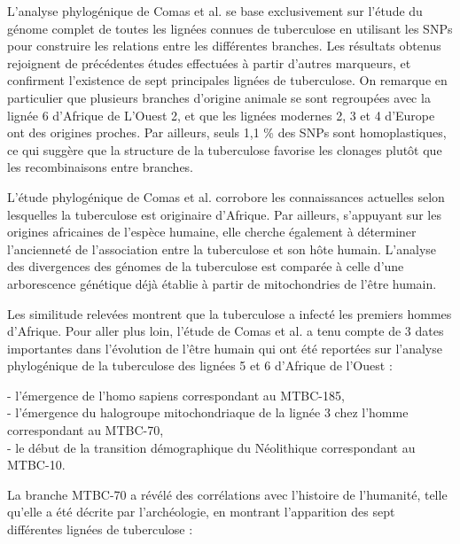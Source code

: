 \documentclass[twoside,a4paper,11pt,frenchb,openany]{report}
\begin{document}

L'analyse phylogénique de Comas et al.\cite{comas} se base exclusivement sur l'étude du génome complet de toutes les lignées connues de tuberculose en utilisant les SNPs pour construire les relations entre les différentes branches. Les résultats obtenus rejoignent de précédentes études effectuées à partir d'autres marqueurs, et confirment l'existence de sept principales lignées de tuberculose. On remarque en particulier que plusieurs branches d'origine animale se sont regroupées avec la lignée 6 d'Afrique de L'Ouest 2, et que les lignées modernes 2, 3 et 4 d'Europe ont des origines proches. Par ailleurs, seuls 1,1 \% des SNPs sont homoplastiques, ce qui suggère que la structure de la tuberculose favorise les clonages plutôt que les recombinaisons entre branches.  


L'étude phylogénique de Comas et al.\cite{comas} corrobore les connaissances actuelles selon lesquelles la tuberculose est originaire d'Afrique. Par ailleurs, s'appuyant sur les origines africaines de l'espèce humaine, elle cherche également à déterminer l'ancienneté de l'association entre la tuberculose et son hôte humain. L'analyse des divergences des génomes de la tuberculose est comparée à celle d'une arborescence génétique déjà établie à partir de mitochondries de l'être humain. 


Les similitude relevées montrent que la tuberculose a infecté les premiers hommes d'Afrique. Pour aller plus loin, l'étude de Comas et al. a tenu compte de 3 dates importantes dans l'évolution de l'être humain qui ont été reportées sur l'analyse phylogénique de la tuberculose des lignées 5 et 6 d'Afrique de l'Ouest :

- l'émergence de l'homo sapiens correspondant au MTBC-185,\\
- l'émergence du halogroupe mitochondriaque de la lignée 3 chez l'homme correspondant au MTBC-70,\\
- le début de la transition démographique du Néolithique correspondant au MTBC-10.

La branche MTBC-70 a révélé des corrélations avec l'histoire de l'humanité, telle qu'elle a été décrite par l'archéologie, en montrant l'apparition des sept différentes lignées de tuberculose :
\end{document}

